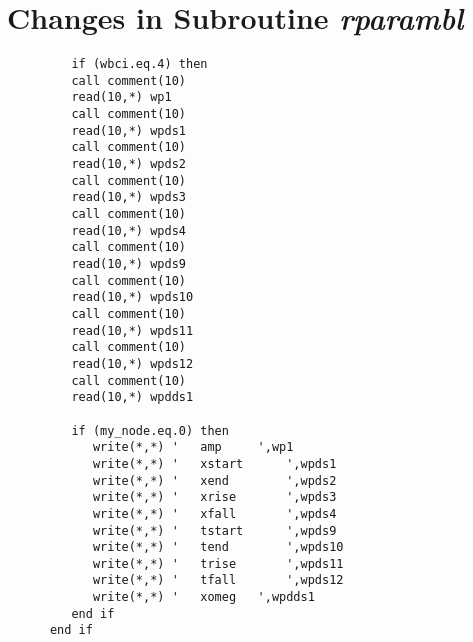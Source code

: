 \section{Changes in Subroutine \emph{rparambl}}
\begin{verbatim}
         if (wbci.eq.4) then
         call comment(10)
         read(10,*) wp1
         call comment(10)
         read(10,*) wpds1
         call comment(10)
         read(10,*) wpds2
         call comment(10)
         read(10,*) wpds3
         call comment(10)
         read(10,*) wpds4
         call comment(10)
         read(10,*) wpds9
         call comment(10)
         read(10,*) wpds10
         call comment(10)
         read(10,*) wpds11
         call comment(10)
         read(10,*) wpds12
         call comment(10)
         read(10,*) wpdds1

         if (my_node.eq.0) then
            write(*,*) '   amp     ',wp1
            write(*,*) '   xstart      ',wpds1
            write(*,*) '   xend        ',wpds2
            write(*,*) '   xrise       ',wpds3
            write(*,*) '   xfall       ',wpds4
            write(*,*) '   tstart      ',wpds9
            write(*,*) '   tend        ',wpds10
            write(*,*) '   trise       ',wpds11
            write(*,*) '   tfall       ',wpds12
            write(*,*) '   xomeg   ',wpdds1
         end if
      end if
\end{verbatim}
